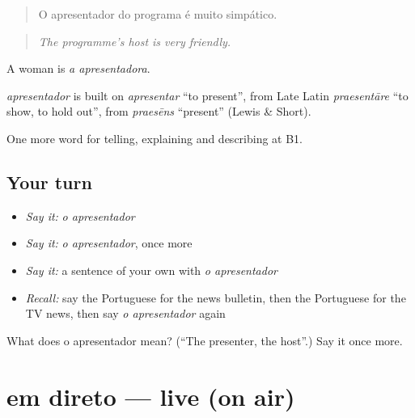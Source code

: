 \begin{quote}
O apresentador do programa é muito simpático.
\end{quote}

\begin{quote}
\emph{The programme’s host is very friendly.}
\end{quote}

A woman is \emph{a apresentadora}.

\begin{cousinweb}
\emph{apresentador} is built on \emph{apresentar} \textquotedblleft{}to present\textquotedblright{}, from Late Latin \emph{praesentāre} \textquotedblleft{}to show, to hold out\textquotedblright{}, from \emph{praesēns} \textquotedblleft{}present\textquotedblright{} (Lewis \& Short).
\end{cousinweb}

\begin{grammarlens}[title={What you've built}]
One more word for telling, explaining and describing at B1.
\end{grammarlens}

\subsection*{Your turn}
\begin{itemize}
\raggedright
  \item \emph{Say it:} \emph{o apresentador}
  \item \emph{Say it:} \emph{o apresentador}, once more
  \item \emph{Say it:} a sentence of your own with \emph{o apresentador}
  \item \emph{Recall:} say the Portuguese for the news bulletin, then the Portuguese for the TV news, then say \emph{o apresentador} again
\end{itemize}

\begin{tcolorbox}[breakable,colback=teal!4,colframe=teal!35!black,title={Before you move on}]
What does o apresentador mean? (\textquotedblleft{}The presenter, the host\textquotedblright{}.) Say it once more.
\end{tcolorbox}
\section[em direto]{em direto — live (on air)}

\label{lesson:PT-C278-em-direto}



